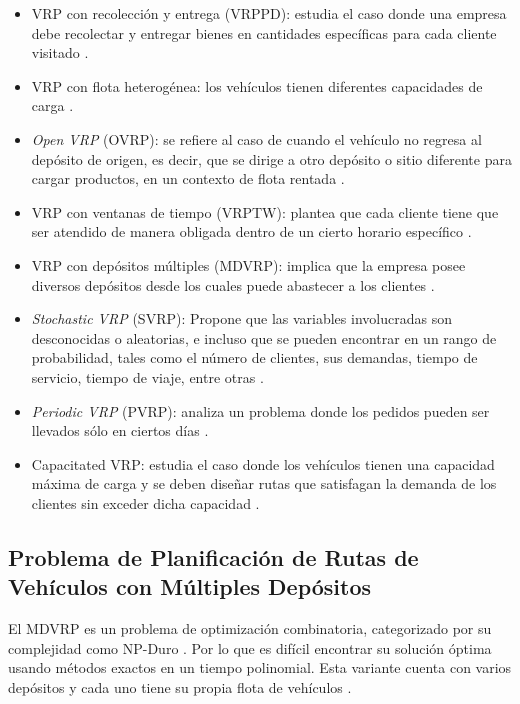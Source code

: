 \begin{itemize}
  \item VRP con recolección y entrega (VRPPD): estudia el caso donde una empresa debe recolectar y entregar bienes en cantidades específicas para cada cliente visitado \parencite{berbegliaDynamicPickupDelivery2007}.
  \item VRP con flota heterogénea: los vehículos tienen diferentes capacidades de carga  \parencite{baldacciRoutingHeterogeneousFleet2008}.
  \item \textit{Open VRP} (OVRP): se refiere al caso de cuando el vehículo no regresa al depósito de origen, es decir, que se dirige a otro depósito o sitio diferente para cargar productos, en un contexto de flota rentada \parencite{sariklisHeuristicMethodOpen2000}.
  \item VRP con ventanas de tiempo (VRPTW): plantea que cada cliente tiene que ser atendido de manera obligada dentro de un cierto horario específico \parencite{cordeauVRPTimeWindows2002}.
  \item VRP con depósitos múltiples (MDVRP): implica que la empresa posee diversos depósitos desde los cuales puede abastecer a los clientes \parencite{montoya-torresLiteratureReviewVehicle2015}.
  \item \textit{Stochastic VRP} (SVRP): Propone que las variables involucradas son desconocidas o aleatorias, e incluso que se pueden encontrar en un rango de probabilidad, tales como el número de clientes, sus demandas, tiempo de servicio, tiempo de viaje, entre otras \parencite{gendreauStochasticVehicleRouting1996}.
  \item \textit{Periodic VRP} (PVRP): analiza un problema donde los pedidos pueden ser llevados sólo en ciertos días  \parencite{francisPeriodVehicleRouting2008}.
  \item Capacitated VRP: estudia el caso donde los vehículos tienen una capacidad máxima de carga y se deben dise\~nar rutas que satisfagan la demanda de los clientes sin exceder dicha capacidad \parencite{ibrahimCAPACITATEDVEHICLEROUTING2019}.
\end{itemize}

\subsection{Problema de Planificación de Rutas de Vehículos con Múltiples Depósitos}

El MDVRP es un problema de optimización combinatoria, categorizado por su complejidad como NP-Duro  \parencite{rebillasloredoMultidepotVRPVehicle2018}. Por lo que es difícil encontrar su solución óptima usando métodos exactos en un tiempo polinomial. Esta variante cuenta con varios depósitos y cada uno tiene su propia flota de vehículos  \parencite{colinDisenoAlgoritmoMetaheuristico2024}.

